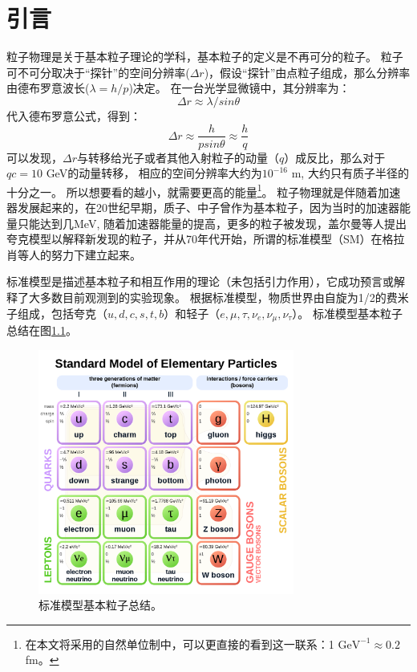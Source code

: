 \chapter{引言}\label{chap:introduction}
粒子物理是关于基本粒子理论的学科，基本粒子的定义是不再可分的粒子。
粒子可不可分取决于“探针”的空间分辨率($\Delta r$)，假设“探针”由点粒子组成，那么分辨率由德布罗意波长($\lambda=h/p$)决定。
在一台光学显微镜中，其分辨率为：
\begin{equation}
 \Delta r\approx \lambda/sin\theta
\end{equation}
代入德布罗意公式，得到：
\begin{equation}
 \Delta r\approx \frac{h}{psin\theta}\approx \frac{h}{q}
\end{equation}
可以发现，$\Delta r$与转移给光子或者其他入射粒子的动量（$q$）成反比，那么对于$qc=10$ GeV的动量转移，
相应的空间分辨率大约为$10^{-16}$ m, 大约只有质子半径的十分之一。
所以想要看的越小，就需要更高的能量\footnote{在本文将采用的自然单位制中，可以更直接的看到这一联系：1 $\text{GeV}^{-1}\approx 0.2$ fm。}。
粒子物理就是伴随着加速器发展起来的，在20世纪早期，质子、中子曾作为基本粒子，因为当时的加速器能量只能达到几MeV,
随着加速器能量的提高，更多的粒子被发现，盖尔曼等人提出夸克模型以解释新发现的粒子\cite{GELLMANN1964214,Zweig:352337,Zweig:570209}，并从70年代开始，所谓的标准模型（SM）在格拉肖等人的努力下建立起来\cite{GLASHOW1961579,PhysRevLett.19.1264,PhysRev.136.B763,PhysRevLett.30.1343,THOOFT1972189}。

标准模型是描述基本粒子和相互作用的理论（未包括引力作用），它成功预言或解释了大多数目前观测到的实验现象。
根据标准模型，物质世界由自旋为1/2的费米子组成，包括夸克（$u, d, c, s, t, b$）和轻子（$e, \mu, \tau, \nu_e, \nu_{\mu}, \nu_{\tau}$）。
标准模型基本粒子总结在图\ref{fig:SM_particles}。
\begin{figure}
 \centering
 \includegraphics[width=0.75\textwidth]{fig/SM_particles.png}
 \caption{标准模型基本粒子总结。}
 \label{fig:SM_particles}
\end{figure}

